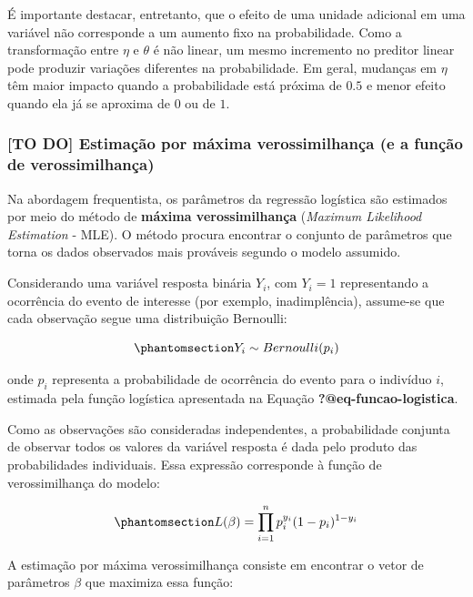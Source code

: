 \documentclass[
  brazilian,
  12pt,
  letterpaper,
  DIV=11,
  numbers=noendperiod]{scrartcl}
\begin{document}
É importante destacar, entretanto, que o efeito de uma unidade adicional
em uma variável não corresponde a um aumento fixo na probabilidade. Como
a transformação entre \(\eta\) e \(\theta\) é não linear, um mesmo
incremento no preditor linear pode produzir variações diferentes na
probabilidade. Em geral, mudanças em \(\eta\) têm maior impacto quando a
probabilidade está próxima de \(0.5\) e menor efeito quando ela já se
aproxima de \(0\) ou de \(1\).

\subsubsection{{[}TO DO{]} Estimação por máxima verossimilhança (e a
função de
verossimilhança)}\label{to-do-estimauxe7uxe3o-por-muxe1xima-verossimilhanuxe7a-e-a-funuxe7uxe3o-de-verossimilhanuxe7a}

Na abordagem frequentista, os parâmetros da regressão logística são
estimados por meio do método de \textbf{máxima verossimilhança}
(\emph{Maximum Likelihood Estimation} - MLE). O método procura encontrar
o conjunto de parâmetros que torna os dados observados mais prováveis
segundo o modelo assumido.

Considerando uma variável resposta binária \(Y_i\), com \(Y_i=1\)
representando a ocorrência do evento de interesse (por exemplo,
inadimplência), assume-se que cada observação segue uma distribuição
Bernoulli:

\begin{equation}\protect\phantomsection\label{eq-bernoulli-logistica}{
Y_i \sim Bernoulli(p_i)
}\end{equation}

onde \(p_i\) representa a probabilidade de ocorrência do evento para o
indivíduo \(i\), estimada pela função logística apresentada na Equação
\textbf{?@eq-funcao-logistica}.

Como as observações são consideradas independentes, a probabilidade
conjunta de observar todos os valores da variável resposta é dada pelo
produto das probabilidades individuais. Essa expressão corresponde à
função de verossimilhança do modelo:

\begin{equation}\protect\phantomsection\label{eq-verossimilhaneca-logistica}{
L(\beta)=\prod_{i=1}^{n}p_i^{y_i}(1-p_i)^{1-y_i}
}\end{equation}

A estimação por máxima verossimilhança consiste em encontrar o vetor de
parâmetros \(\beta\) que maximiza essa função:
\end{document}
